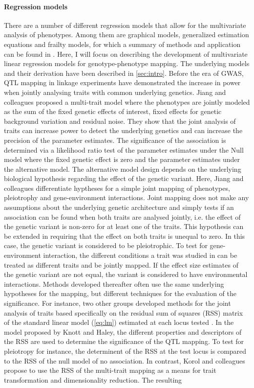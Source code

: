 \paragraph{Regression models} There are a number of different regression models that allow for the multivariate analysis of phenotypes. Among them are graphical models, generalized estimation equations and frailty models, for which a summary of methods and application can be found in \citep{Shriner2012,Yang2012}. Here, I will focus on describing the development of multivariate linear regression models for genotype-phenotype mapping. The underlying models and their derivation have been described in \cref{sec:intro}. Before the era of GWAS, QTL mapping in linkage experiments have demonstrated the increase in power when jointly analysing traits with common underlying genetics. Jiang and colleagues \citeyearpar{Jiang1995} proposed a multi-trait model where the phenotypes are jointly modeled as the sum of the fixed genetic effects of interest, fixed effects for genetic background variation and residual noise. They show that the joint analysis of traits can increase power to detect the underlying genetics and can increase the precision of the parameter estimates. The significance of the association is determined via a likelihood ratio test of the parameter estimates under the Null model where the fixed genetic effect is zero and the parameter estimates under the alternative model. The alternative model design depends on the underlying biological hypothesis regarding the effect of the genetic variant. Here, Jiang and colleagues differentiate hyptheses for a simple joint mapping of phenotypes, pleiotrophy and gene-environment interactions. Joint mapping does not make any assumptions about the underlying genetic architecture and simply tests if an association can be found when both traits are analysed jointly, i.e. the effect of the genetic variant is non-zero for at least one of the traits. This hypothesis can be extended in requiring that the effect on both traits is unequal to zero. In this case, the genetic variant is considered to be pleiotrophic. To test for gene-environment interaction, the different conditions a trait was studied in can be treated as different traits and be jointly mapped. If the effect size estimates of the genetic variant are not equal, the variant is considered to have environmental interactions.  Methods developed thereafter often use the same underlying hypotheses for the mapping, but different techniques for the evaluation of the significance. For instance, two other groups developed methods for the joint analysis of traits based specifically on the residual sum of squares (RSS) matrix of the standard linear model (\cref{eq:lm}) estimated at each locus tested \citep{Knott2000,Korol2001}. In the model proposed by Knott and Haley, the different properties and descriptors of the RSS are used to determine the significance of the QTL mapping. To test for pleiotropy for instance, the determinent of the RSS at the test locus is compared to the RSS of the null model of no association. In contrast, Korol and colleagues propose to use the RSS of the multi-trait mapping as a means for trait transformation and dimensionality reduction. The resulting 